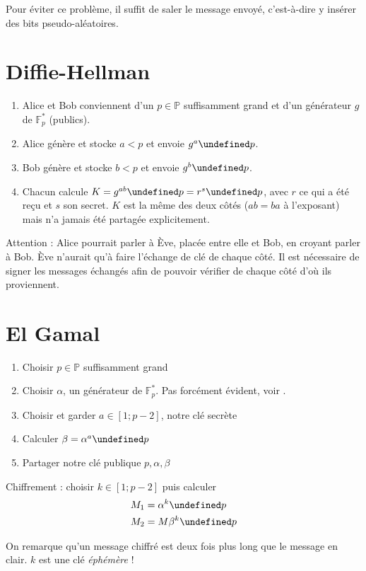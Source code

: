 \documentclass[11pt,twocolumn]{article}
\let\mod\undefined
\DeclareMathOperator{\mod}{mod}
\theoremstyle{plain}
\newcommand{\esP}{\mathbb{P}} %
\newcommand{\esF}{\mathbb{F}} %
\begin{document}
Pour éviter ce problème, il suffit de saler le message envoyé, c'est-à-dire y
insérer des bits pseudo-aléatoires.


\section{Diffie-Hellman}
\begin{enumerate}
	\item Alice et Bob conviennent d'un $p \in \esP$ suffisamment grand
		et d'un générateur $g$ de $\esF_p^*$ (publics).
	\item Alice génère et stocke $a<p$ et envoie $g^a \mod p$.
	\item Bob génère et stocke $b<p$ et envoie $g^b \mod p$.
	\item Chacun calcule $K = g^{ab} \mod p = r^s \mod p$, avec $r$ ce qui a été
		reçu et $s$ son secret. $K$ est la même des deux côtés ($ab=ba$ à
		l'exposant) mais n'a jamais été partagée explicitement.
\end{enumerate}

Attention : Alice pourrait parler à Ève, placée entre elle et Bob, en croyant
parler à Bob. Ève n'aurait qu'à faire l'échange de clé de chaque côté.
Il est nécessaire de signer les messages échangés
afin de pouvoir vérifier de chaque côté d'où ils proviennent.


\section{El Gamal}
\begin{enumerate}
	\item Choisir $p \in \esP$ suffisamment grand
	\item Choisir $\alpha$, un générateur de $\esF_p^*$.
		Pas forcément évident, voir \cite[p. 163--164]{hac}.
	\item Choisir et garder $a \in [1;p-2]$, notre clé secrète
	\item Calculer $\beta=\alpha^a \mod p$
	\item Partager notre clé publique $p, \alpha, \beta$
\end{enumerate}

Chiffrement : choisir $k \in [1;p-2]$ puis calculer
\begin{align*}
	M_1 &= \alpha^k \mod p \\
	M_2 &= M\beta^k \mod p
\end{align*}

On remarque qu'un message chiffré est deux fois plus long
que le message en clair. $k$ est une clé \emph{éphémère} !
\end{document}
